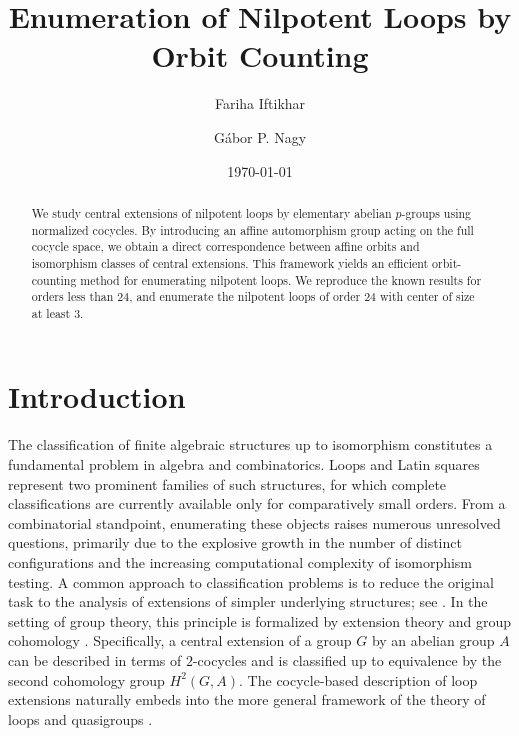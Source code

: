 \documentclass[12pt,a4paper]{amsart}
\title{Enumeration of Nilpotent Loops by Orbit Counting}
\author{Fariha Iftikhar}
\author{G\'abor P. Nagy}
\date{\today}
\theoremstyle{definition}
\begin{document}
\begin{abstract}


We study central extensions of nilpotent loops by elementary abelian $p$-groups using normalized cocycles. By introducing an affine automorphism group acting on the full cocycle space, we obtain a direct correspondence between affine orbits and isomorphism classes of central extensions. This framework yields an efficient orbit-counting method for enumerating nilpotent loops. We reproduce the known results for orders less than 24, and enumerate the nilpotent loops of order 24 with center of size at least 3.
\end{abstract}

\maketitle



\section{Introduction}

The classification of finite algebraic structures up to isomorphism constitutes a fundamental problem in algebra and combinatorics. Loops and Latin squares represent two prominent families of such structures, for which complete classifications are currently available only for comparatively small orders. From a combinatorial standpoint, enumerating these objects raises numerous unresolved questions, primarily due to the explosive growth in the number of distinct configurations and the increasing computational complexity of isomorphism testing. A common approach to classification problems is to reduce the original task to the analysis of extensions of simpler underlying structures; see \cite{nagypeter2019nuclear, SemaniSinovaStanovsky2023three}. In the setting of group theory, this principle is formalized by extension theory and group cohomology \cite{schreier1926erweiterung}. Specifically, a central extension of a group $G$ by an abelian group $A$ can be described in terms of $2$-cocycles and is classified up to equivalence by the second cohomology group $H^2(G, A)$. The cocycle-based description of loop extensions naturally embeds into the more general framework of the theory of loops and quasigroups \cite{bruck1971survey,pflugfelder1990quasigroups}. 
\end{document}

